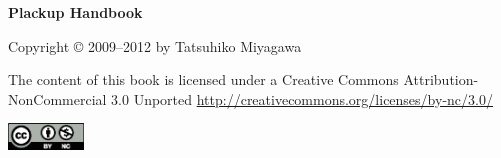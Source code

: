 \thispagestyle{empty}
\small
\null
\vfill
\begin{center}
  \textbf{Plackup Handbook}

  \bigskip
  
  Copyright \copyright{} 2009--2012 by Tatsuhiko Miyagawa

  \bigskip

  The content of this book is licensed under a Creative Commons Attribution-NonCommercial 3.0 Unported 
  \url{http://creativecommons.org/licenses/by-nc/3.0/}

  \medskip

\includegraphics[width=2cm]{images/cc-by-nc}
\end{center}



